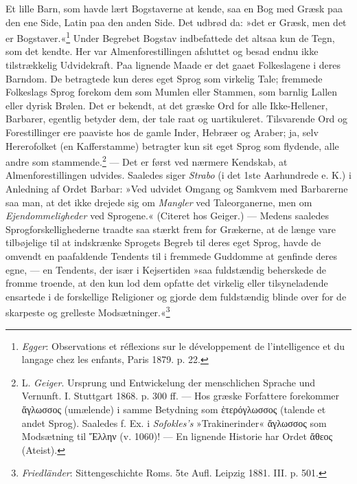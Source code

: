 \documentclass[12pt,a4paper,openany]{book}
\newcommand{\opage}[1]{\marginnote{\footnotesize\textit{[#1]}}}
\begin{document}
Et lille Barn, som havde lært Bogstaverne at kende, saa en Bog med Græsk
paa den ene Side, Latin paa den anden Side. Det udbrød da: »det er
Græsk, men det er Bogstaver.«\footnote[1]{\emph{Egger}: Observations et
réflexions sur le développement de l’intelligence et du langage chez les
enfants, Paris 1879. p. 22.} Under Begrebet Bogstav indbefattede det
altsaa kun de Tegn, som det kendte. Her var Almenforestillingen
afsluttet og besad endnu ikke tilstrækkelig Udvidekraft. Paa lignende
Maade er det gaaet Folkeslagene i deres Barndom. De betragtede kun deres
eget Sprog som virkelig Tale; fremmede Folkeslags Sprog forekom dem som
Mumlen eller Stammen, som barnlig Lallen eller dyrisk Brølen. Det er
bekendt, at det græske Ord for alle Ikke-Hellener, Barbarer, egentlig
betyder dem, der tale raat og uartikuleret. Tilsvarende Ord og
Forestillinger ere paaviste hos de gamle Inder, Hebræer og Araber; ja,
selv Hererofolket (en Kafferstamme) betragter kun sit eget Sprog som
flydende, alle andre som stammende.\footnote[2]{L. \emph{Geiger}.
Ursprung und Entwickelung der menschlichen Sprache und Vernunft. I.
Stuttgart 1868. p. 300 ff. --- Hos græske Forfattere forekommer ἄγλωσσος
(umælende) i samme Betydning som ἑτερόγλωσσος (talende et andet Sprog).
Saaledes f. Ex. i \emph{Sofokles’s} »Trakinerinder« ἄγλωσσος som Modsætning til
Ἕλλην (v. 1060)! --- En lignende Historie har Ordet ἄθεος (Ateist).} ---
Det er først ved nærmere Kendskab, at Almenforestillingen udvides.
Saaledes siger \emph{Strabo} (i det 1ste Aarhundrede e. K.) i Anledning
af Ordet Barbar: »Ved udvidet Omgang og Samkvem med Barbarerne saa man,
at det ikke drejede sig om \emph{Mangler} ved Taleorganerne, men om
\emph{Ejendommeligheder}
\opage{205}ved Sprogene.« (Citeret hos Geiger.) --- Medens saaledes
Sprogforskellighederne traadte saa stærkt frem for Grækerne, at de længe
vare tilbøjelige til at indskrænke Sprogets Begreb til deres eget Sprog,
havde de omvendt en paafaldende Tendents til i fremmede Guddomme at
genfinde deres egne, --- en Tendents, der især i Kejsertiden »saa
fuldstændig beherskede de fromme troende, at den kun lod dem opfatte det
virkelig eller tilsyneladende ensartede i de forskellige Religioner og
gjorde dem fuldstændig blinde over for de skarpeste og grelleste
Modsætninger.«\footnote[1]{\emph{Friedländer}: Sittengeschichte Roms.
5te Aufl. Leipzig 1881. III. p. 501.}
\end{document}
